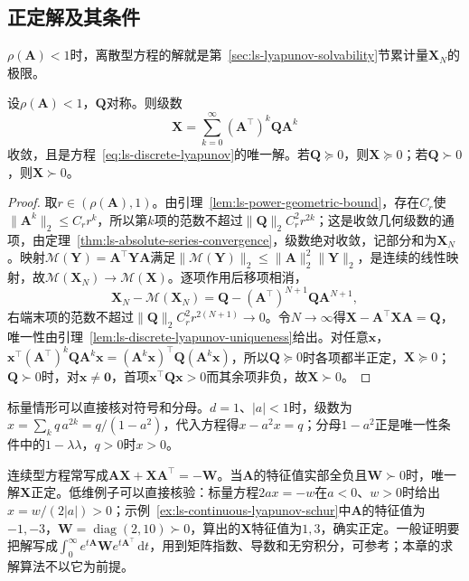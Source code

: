 \subsection{正定解及其条件}
\label{sec:ls-lyapunov-positivity}

$\rho(\bm A)<1$时，离散型方程的解就是第~\ref{sec:ls-lyapunov-solvability}节累计量$\bm X_N$的极限。

\begin{theorem}[离散型Lyapunov方程的级数解]
\label{thm:ls-discrete-lyapunov-series}
设$\rho(\bm A)<1$，$\bm Q$对称。则级数
\begin{equation}
 \bm X=\sum_{k=0}^{\infty}(\bm A^\top)^k\bm Q\bm A^k
 \label{eq:ls-discrete-lyapunov-series}
\end{equation}
收敛，且是方程~\eqref{eq:ls-discrete-lyapunov}的唯一解。若$\bm Q\succeq0$，则$\bm X\succeq0$；若$\bm Q\succ0$，则$\bm X\succ0$。
\end{theorem}

\begin{proof}
取$r\in(\rho(\bm A),1)$。由引理~\ref{lem:ls-power-geometric-bound}，存在$C_r$使$\lVert\bm A^k\rVert_2\leq C_rr^k$，所以第$k$项的范数不超过$\lVert\bm Q\rVert_2C_r^2r^{2k}$；这是收敛几何级数的通项，由定理~\ref{thm:ls-absolute-series-convergence}，级数绝对收敛，记部分和为$\bm X_N$。映射$\mathcal M(\bm Y)=\bm A^\top\bm Y\bm A$满足$\lVert\mathcal M(\bm Y)\rVert_2\leq\lVert\bm A\rVert_2^2\lVert\bm Y\rVert_2$，是连续的线性映射，故$\mathcal M(\bm X_N)\to\mathcal M(\bm X)$。逐项作用后移项相消，
\[
 \bm X_N-\mathcal M(\bm X_N)=\bm Q-(\bm A^\top)^{N+1}\bm Q\bm A^{N+1},
\]
右端末项的范数不超过$\lVert\bm Q\rVert_2C_r^2r^{2(N+1)}\to0$。令$N\to\infty$得$\bm X-\bm A^\top\bm X\bm A=\bm Q$，唯一性由引理~\ref{lem:ls-discrete-lyapunov-uniqueness}给出。对任意$\bm x$，$\bm x^\top(\bm A^\top)^k\bm Q\bm A^k\bm x=(\bm A^k\bm x)^\top\bm Q(\bm A^k\bm x)$，所以$\bm Q\succeq0$时各项都半正定，$\bm X\succeq0$；$\bm Q\succ0$时，对$\bm x\neq\bm0$，首项$\bm x^\top\bm Q\bm x>0$而其余项非负，故$\bm X\succ0$。
\end{proof}

标量情形可以直接核对符号和分母。$d=1$、$|a|<1$时，级数为$x=\sum_kq\,a^{2k}=q/(1-a^2)$，代入方程得$x-a^2x=q$；分母$1-a^2$正是唯一性条件中的$1-\lambda\lambda$，$q>0$时$x>0$。

连续型方程常写成$\bm A\bm X+\bm X\bm A^\top=-\bm W$。当$\bm A$的特征值实部全负且$\bm W\succ0$时，唯一解$\bm X$正定。低维例子可以直接核验：标量方程$2ax=-w$在$a<0$、$w>0$时给出$x=w/(2|a|)>0$；示例~\ref{ex:ls-continuous-lyapunov-schur}中$\bm A$的特征值为$-1,-3$，$\bm W=\operatorname{diag}(2,10)\succ0$，算出的$\bm X$特征值为$1,3$，确实正定。一般证明要把解写成$\int_0^\infty e^{t\bm A}\bm We^{t\bm A^\top}\,\mathrm dt$，用到矩阵指数、导数和无穷积分，可参考；本章的求解算法不以它为前提。

